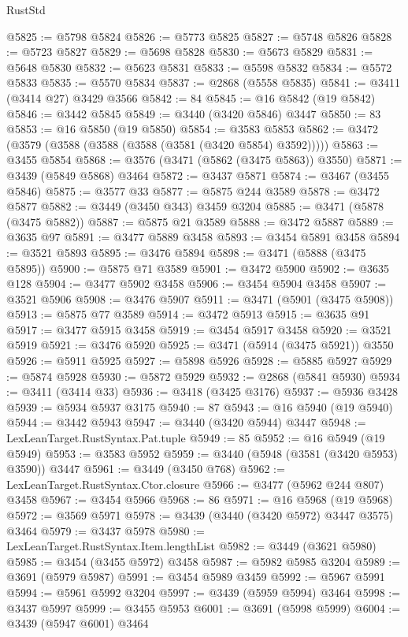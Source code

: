 \begin{lexlean}{RustStd}
\begin{coremodule}
{{{{{{{{{{{{{{{{{{{@5825 := @5798 @5824
@5826 := @5773 @5825
@5827 := @5748 @5826
@5828 := @5723 @5827
@5829 := @5698 @5828
@5830 := @5673 @5829
@5831 := @5648 @5830
@5832 := @5623 @5831
@5833 := @5598 @5832
@5834 := @5572 @5833
@5835 := @5570 @5834
@5837 := @2868 (@5558 @5835)
@5841 := @3411 (@3414 @27) @3429 @3566
@5842 := 84
@5845 := @16 @5842 (@19 @5842)
@5846 := @3442 @5845
@5849 := @3440 (@3420 @5846) @3447
@5850 := 83
@5853 := @16 @5850 (@19 @5850)
@5854 := @3583 @5853
@5862 := @3472 (@3579 (@3588 (@3588 (@3588 (@3581 (@3420 @5854) @3592)))))
@5863 := @3455 @5854
@5868 := @3576 (@3471 (@5862 (@3475 @5863)) @3550)
@5871 := @3439 (@5849 @5868) @3464
@5872 := @3437 @5871
@5874 := @3467 (@3455 @5846)
@5875 := @3577 @33
@5877 := @5875 @244 @3589
@5878 := @3472 @5877
@5882 := @3449 (@3450 @343) @3459 @3204
@5885 := @3471 (@5878 (@3475 @5882))
@5887 := @5875 @21 @3589
@5888 := @3472 @5887
@5889 := @3635 @97
@5891 := @3477 @5889 @3458
@5893 := @3454 @5891 @3458
@5894 := @3521 @5893
@5895 := @3476 @5894
@5898 := @3471 (@5888 (@3475 @5895))
@5900 := @5875 @71 @3589
@5901 := @3472 @5900
@5902 := @3635 @128
@5904 := @3477 @5902 @3458
@5906 := @3454 @5904 @3458
@5907 := @3521 @5906
@5908 := @3476 @5907
@5911 := @3471 (@5901 (@3475 @5908))
@5913 := @5875 @77 @3589
@5914 := @3472 @5913
@5915 := @3635 @91
@5917 := @3477 @5915 @3458
@5919 := @3454 @5917 @3458
@5920 := @3521 @5919
@5921 := @3476 @5920
@5925 := @3471 (@5914 (@3475 @5921)) @3550
@5926 := @5911 @5925
@5927 := @5898 @5926
@5928 := @5885 @5927
@5929 := @5874 @5928
@5930 := @5872 @5929
@5932 := @2868 (@5841 @5930)
@5934 := @3411 (@3414 @33)
@5936 := @3418 (@3425 @3176)
@5937 := @5936 @3428
@5939 := @5934 @5937 @3175
@5940 := 87
@5943 := @16 @5940 (@19 @5940)
@5944 := @3442 @5943
@5947 := @3440 (@3420 @5944) @3447
@5948 := LexLeanTarget.RustSyntax.Pat.tuple
@5949 := 85
@5952 := @16 @5949 (@19 @5949)
@5953 := @3583 @5952
@5959 := @3440 (@5948 (@3581 (@3420 @5953) @3590)) @3447
@5961 := @3449 (@3450 @768)
@5962 := LexLeanTarget.RustSyntax.Ctor.closure
@5966 := @3477 (@5962 @244 @807) @3458
@5967 := @3454 @5966
@5968 := 86
@5971 := @16 @5968 (@19 @5968)
@5972 := @3569 @5971
@5978 := @3439 (@3440 (@3420 @5972) @3447 @3575) @3464
@5979 := @3437 @5978
@5980 := LexLeanTarget.RustSyntax.Item.lengthList
@5982 := @3449 (@3621 @5980)
@5985 := @3454 (@3455 @5972) @3458
@5987 := @5982 @5985 @3204
@5989 := @3691 (@5979 @5987)
@5991 := @3454 @5989 @3459
@5992 := @5967 @5991
@5994 := @5961 @5992 @3204
@5997 := @3439 (@5959 @5994) @3464
@5998 := @3437 @5997
@5999 := @3455 @5953
@6001 := @3691 (@5998 @5999)
@6004 := @3439 (@5947 @6001) @3464
}}}}}}}}}}}}}}}}}}}
\end{coremodule}
\end{lexlean}
